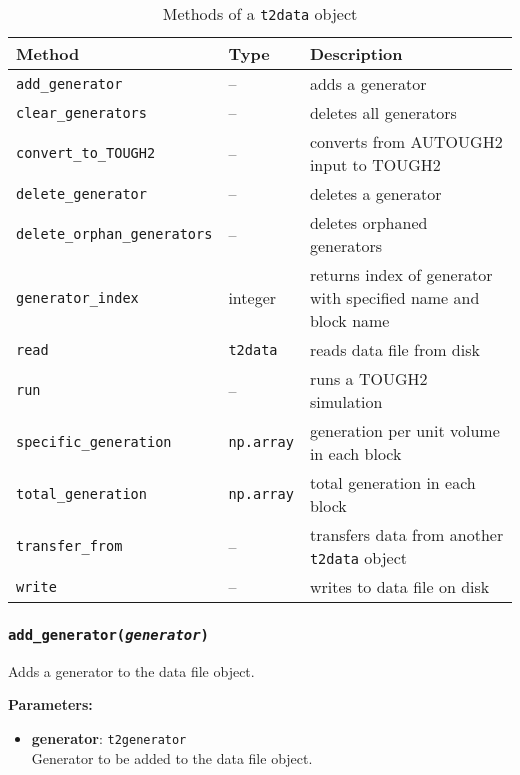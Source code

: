 \begin{table}
  \begin{center}
    \begin{tabular}{|l|l|p{65mm}|}
      \hline
      \textbf{Method} & \textbf{Type} & \textbf{Description}\\
      \hline
      \texttt{add\_generator} & -- & adds a generator\\
      \texttt{clear\_generators} & -- & deletes all generators\\
      \texttt{convert\_to\_TOUGH2} & -- & converts from AUTOUGH2 input to TOUGH2\\
      \texttt{delete\_generator} & -- & deletes a generator\\
      \texttt{delete\_orphan\_generators} & -- & deletes orphaned generators\\
      \texttt{generator\_index} & integer & returns index of generator with specified name and block name\\
      \texttt{read} & \texttt{t2data} & reads data file from disk\\
      \texttt{run} & -- & runs a TOUGH2 simulation\\
      \texttt{specific\_generation} & \texttt{np.array} & generation per unit volume in each block\\
      \texttt{total\_generation} & \texttt{np.array} & total generation in each block\\
      \texttt{transfer\_from} & -- & transfers data from another \texttt{t2data} object\\
      \texttt{write} & -- & writes to data file on disk\\
      \hline
    \end{tabular}
    \caption{Methods of a \texttt{t2data} object}
    \label{tb:t2data_methods}
  \end{center}
\end{table}

\subsubsection{\texttt{add\_generator(\emph{generator})}}

Adds a generator to the data file object.

\textbf{Parameters:}
\begin{itemize}
\item \textbf{generator}: \texttt{t2generator}\\
  Generator to be added to the data file object.
\end{itemize}

